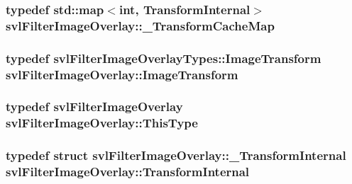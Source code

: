 \subsubsection[{\+\_\+\+Transform\+Cache\+Map}]{\setlength{\rightskip}{0pt plus 5cm}typedef std\+::map$<$int, {\bf Transform\+Internal}$>$ {\bf svl\+Filter\+Image\+Overlay\+::\+\_\+\+Transform\+Cache\+Map}\hspace{0.3cm}{\ttfamily [protected]}}\label{classsvl_filter_image_overlay_ae7f68bdaad7a6718f5d38e99099fd1a4}
\hypertarget{classsvl_filter_image_overlay_a68354a171b2498de3aa1c5ba0ff2f002}{}
\subsubsection[{Image\+Transform}]{\setlength{\rightskip}{0pt plus 5cm}typedef {\bf svl\+Filter\+Image\+Overlay\+Types\+::\+Image\+Transform} {\bf svl\+Filter\+Image\+Overlay\+::\+Image\+Transform}}\label{classsvl_filter_image_overlay_a68354a171b2498de3aa1c5ba0ff2f002}
\hypertarget{classsvl_filter_image_overlay_a9e4175de9ad9d65a5621a9fd78da6227}{}
\subsubsection[{This\+Type}]{\setlength{\rightskip}{0pt plus 5cm}typedef {\bf svl\+Filter\+Image\+Overlay} {\bf svl\+Filter\+Image\+Overlay\+::\+This\+Type}}\label{classsvl_filter_image_overlay_a9e4175de9ad9d65a5621a9fd78da6227}
\hypertarget{classsvl_filter_image_overlay_a18061cddeca5ead367351cc833ce7c4e}{}
\subsubsection[{Transform\+Internal}]{\setlength{\rightskip}{0pt plus 5cm}typedef struct {\bf svl\+Filter\+Image\+Overlay\+::\+\_\+\+Transform\+Internal}  {\bf svl\+Filter\+Image\+Overlay\+::\+Transform\+Internal}\hspace{0.3cm}{\ttfamily [protected]}}\label{classsvl_filter_image_overlay_a18061cddeca5ead367351cc833ce7c4e}


